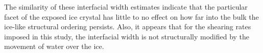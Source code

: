 \documentclass[aps,jcp,preprint,showpacs,superscriptaddress,groupedaddress]{revtex4}  %
\begin{document}




The similarity of these interfacial width estimates indicate that the
particular facet of the exposed ice crystal has little to no effect on
how far into the bulk the ice-like structural ordering persists. Also,
it appears that for the shearing rates imposed in this study, the
interfacial width is not structurally modified by the movement of
water over the ice.
\end{document}
